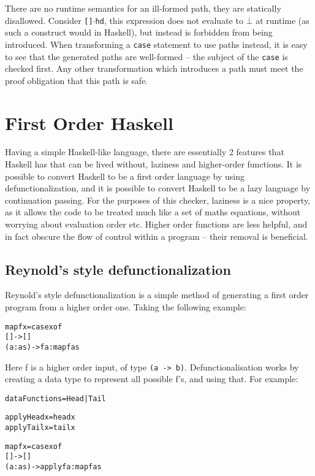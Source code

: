 \documentclass[preprint]{sigplanconf}
\newcommand{\T}[1]{\texttt{#1}}
\newenvironment{code}{\begin{alltt}\small}{\end{alltt}}
\newcommand{\D}{\ensuremath{\cdot}} %
\begin{document}
There are no runtime semantics for an ill-formed path, they are statically
disallowed. Consider \T{[]\D{}hd}, this expression does not evaluate to
$\bot{}$ at runtime (as such a construct would in Haskell), but instead is
forbidden from being introduced. When transforming a \T{case} statement to use
paths instead, it is easy to see that the generated paths are well-formed --
the subject of the \T{case} is checked first. Any other transformation which
introduces a path must meet the proof obligation that this path is safe.

\section{First Order Haskell}
\label{chap:defunc}

Having a simple Haskell-like language, there are essentially 2 features that
Haskell has that can be lived without, laziness and higher-order functions. It
is possible to convert Haskell to be a first order language by using
defunctionalization, and it is possible to convert Haskell to be a lazy
language by continuation passing. For the purposes of this checker, laziness is
a nice property, as it allows the code to be treated much like a set of maths
equations, without worrying about evaluation order etc. Higher order functions
are less helpful, and in fact obscure the flow of control within a program --
their removal is beneficial.

\subsection{Reynold's style defunctionalization}

Reynold's style defunctionalization is a simple method of generating a first
order program from a higher order one. Taking the following example:

\begin{code}
 map f x = case x of
                [] -> []
                (a:as) -> f a : map f as
\end{code}

Here f is a higher order input, of type \T{(a -> b)}. Defunctionalisation works
by creating a data type to represent all possible f's, and using that. For
example:

\begin{code}
 data Functions = Head | Tail

 apply Head x = head x
 apply Tail x = tail x

 map f x = case x of
     [] -> []
     (a:as) -> apply f a : map f as
\end{code}
\end{document}
